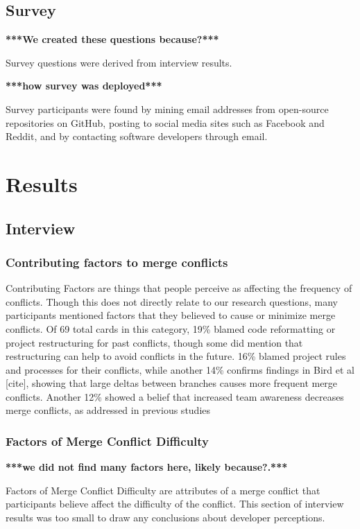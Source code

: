 \documentclass[conference]{IEEEtran}
\begin{document}
\subsection{Survey}

\textbf{***We created these questions because?***}

Survey questions were derived from interview results. 

\textbf{***how survey was deployed***}

Survey participants were found by mining email addresses from open-source repositories on GitHub, posting to social media sites such as Facebook and Reddit, and by contacting software developers through email.

\section{Results}
\subsection{Interview}
\subsubsection{Contributing factors to merge conflicts}

Contributing Factors are things that people perceive as affecting the frequency of conflicts. Though this does not directly relate to our research questions, many participants mentioned factors that they believed to cause or minimize merge conflicts. Of 69 total cards in this category, 19\% blamed code reformatting or project restructuring for past conflicts, though some did mention that restructuring can help to avoid conflicts in the future. 16\% blamed project rules and processes for their conflicts, while another 14\% confirms findings in Bird et al [cite], showing that large deltas between branches causes more frequent merge conflicts. Another 12\% showed a belief that increased team awareness decreases merge conflicts, as addressed in previous studies \cite{Brun2011} \cite{palantir} 

\subsubsection{Factors of Merge Conflict Difficulty}

\textbf{***we did not find many factors here, likely because?.***}

Factors of Merge Conflict Difficulty are attributes of a merge conflict that participants believe affect the difficulty of the conflict. This section of interview results was too small to draw any conclusions about developer perceptions.
\end{document}
